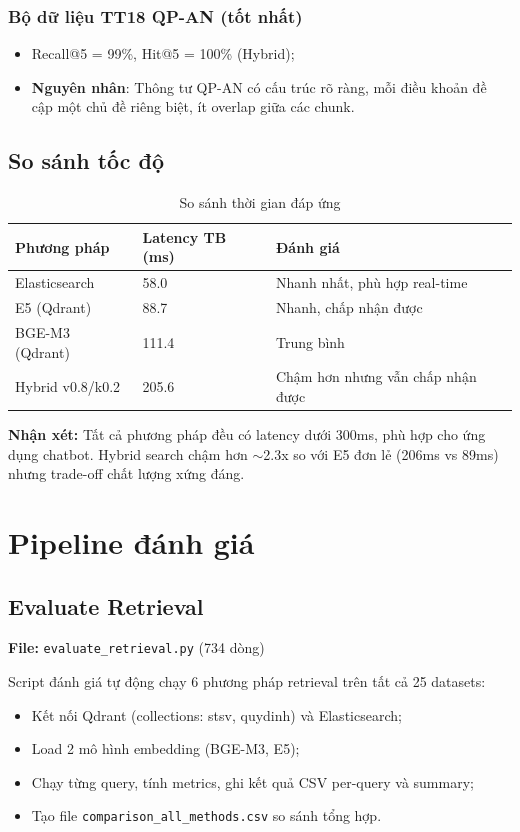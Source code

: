 \documentclass[../DoAn.tex]{subfiles}
\begin{document}
\subsubsection{Bộ dữ liệu TT18 QP-AN (tốt nhất)}
\begin{itemize}
    \item Recall@5 = 99\%, Hit@5 = 100\% (Hybrid);
    \item \textbf{Nguyên nhân}: Thông tư QP-AN có cấu trúc rõ ràng, mỗi điều khoản đề cập một chủ đề riêng biệt, ít overlap giữa các chunk.
\end{itemize}

\subsection{So sánh tốc độ}

\begin{table}[H]
\centering
\begin{tabular}{|l|l|l|}
\hline
\textbf{Phương pháp} & \textbf{Latency TB (ms)} & \textbf{Đánh giá} \\
\hline
Elasticsearch & 58.0 & Nhanh nhất, phù hợp real-time \\
\hline
E5 (Qdrant) & 88.7 & Nhanh, chấp nhận được \\
\hline
BGE-M3 (Qdrant) & 111.4 & Trung bình \\
\hline
Hybrid v0.8/k0.2 & 205.6 & Chậm hơn nhưng vẫn chấp nhận được \\
\hline
\end{tabular}
\caption{So sánh thời gian đáp ứng}
\end{table}

\textbf{Nhận xét:} Tất cả phương pháp đều có latency dưới 300ms, phù hợp cho ứng dụng chatbot. Hybrid search chậm hơn $\sim$2.3x so với E5 đơn lẻ (206ms vs 89ms) nhưng trade-off chất lượng xứng đáng.

\section{Pipeline đánh giá}

\subsection{Evaluate Retrieval}
\textbf{File:} \texttt{evaluate\_retrieval.py} (734 dòng)

Script đánh giá tự động chạy 6 phương pháp retrieval trên tất cả 25 datasets:
\begin{itemize}
    \item Kết nối Qdrant (collections: stsv, quydinh) và Elasticsearch;
    \item Load 2 mô hình embedding (BGE-M3, E5);
    \item Chạy từng query, tính metrics, ghi kết quả CSV per-query và summary;
    \item Tạo file \texttt{comparison\_all\_methods.csv} so sánh tổng hợp.
\end{itemize}
\end{document}
